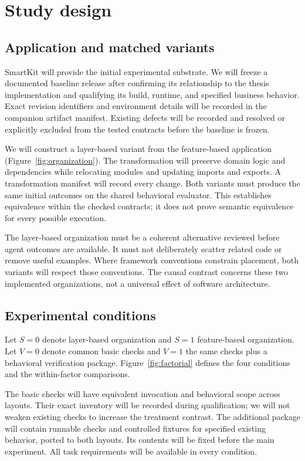 \documentclass[11pt,a4paper]{article}
\begin{document}
\section{Study design}
\subsection{Application and matched variants}
SmartKit will provide the initial experimental substrate. We will freeze a documented baseline release after confirming its relationship to the thesis implementation and qualifying its build, runtime, and specified business behavior. Exact revision identifiers and environment details will be recorded in the companion artifact manifest. Existing defects will be recorded and resolved or explicitly excluded from the tested contracts before the baseline is frozen.

We will construct a layer-based variant from the feature-based application (Figure~\ref{fig:organization}). The transformation will preserve domain logic and dependencies while relocating modules and updating imports and exports. A transformation manifest will record every change. Both variants must produce the same initial outcomes on the shared behavioral evaluator. This establishes equivalence within the checked contracts; it does not prove semantic equivalence for every possible execution.

The layer-based organization must be a coherent alternative reviewed before agent outcomes are available. It must not deliberately scatter related code or remove useful examples. Where framework conventions constrain placement, both variants will respect those conventions. The causal contrast concerns these two implemented organizations, not a universal effect of software architecture.



\subsection{Experimental conditions}
Let $S=0$ denote layer-based organization and $S=1$ feature-based organization. Let $V=0$ denote common basic checks and $V=1$ the same checks plus a behavioral verification package. Figure~\ref{fig:factorial} defines the four conditions and the within-factor comparisons.



The basic checks will have equivalent invocation and behavioral scope across layouts. Their exact inventory will be recorded during qualification; we will not weaken existing checks to increase the treatment contrast. The additional package will contain runnable checks and controlled fixtures for specified existing behavior, ported to both layouts. Its contents will be fixed before the main experiment. All task requirements will be available in every condition.
\end{document}
